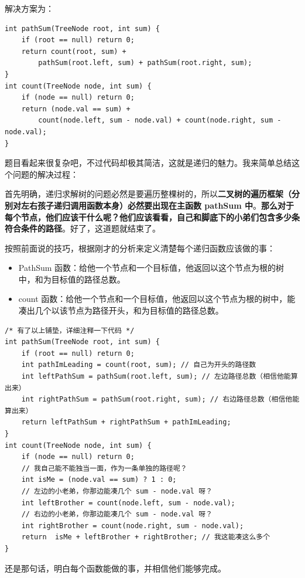\documentclass[12pt]{article}
\begin{document}
解决方案为：
\begin{lstlisting}
int pathSum(TreeNode root, int sum) {
    if (root == null) return 0;
    return count(root, sum) + 
        pathSum(root.left, sum) + pathSum(root.right, sum);
}
int count(TreeNode node, int sum) {
    if (node == null) return 0;
    return (node.val == sum) + 
        count(node.left, sum - node.val) + count(node.right, sum - node.val);
}
\end{lstlisting}

题目看起来很复杂吧，不过代码却极其简洁，这就是递归的魅力。我来简单总结这个问题的解决过程：

首先明确，递归求解树的问题必然是要遍历整棵树的，所以\textbf{二叉树的遍历框架（分别对左右孩子递归调用函数本身）必然要出现在主函数 pathSum 中}。\textbf{那么对于每个节点，他们应该干什么呢？他们应该看看，自己和脚底下的小弟们包含多少条符合条件的路径}。好了，这道题就结束了。

按照前面说的技巧，根据刚才的分析来定义清楚每个递归函数应该做的事：
\begin{itemize}
\setlength{\itemsep}{0pt}
\setlength{\parsep}{0pt}
\setlength{\parskip}{0pt}
    \item PathSum 函数：给他一个节点和一个目标值，他返回以这个节点为根的树中，和为目标值的路径总数。
    \item count 函数：给他一个节点和一个目标值，他返回以这个节点为根的树中，能凑出几个以该节点为路径开头，和为目标值的路径总数。
\end{itemize}

\begin{lstlisting}
/* 有了以上铺垫，详细注释一下代码 */
int pathSum(TreeNode root, int sum) {
    if (root == null) return 0;
    int pathImLeading = count(root, sum); // 自己为开头的路径数
    int leftPathSum = pathSum(root.left, sum); // 左边路径总数（相信他能算出来）
    int rightPathSum = pathSum(root.right, sum); // 右边路径总数（相信他能算出来）
    return leftPathSum + rightPathSum + pathImLeading;
}
int count(TreeNode node, int sum) {
    if (node == null) return 0;
    // 我自己能不能独当一面，作为一条单独的路径呢？
    int isMe = (node.val == sum) ? 1 : 0;
    // 左边的小老弟，你那边能凑几个 sum - node.val 呀？
    int leftBrother = count(node.left, sum - node.val); 
    // 右边的小老弟，你那边能凑几个 sum - node.val 呀？
    int rightBrother = count(node.right, sum - node.val);
    return  isMe + leftBrother + rightBrother; // 我这能凑这么多个
}
\end{lstlisting}

还是那句话，明白每个函数能做的事，并相信他们能够完成。
\end{document}
